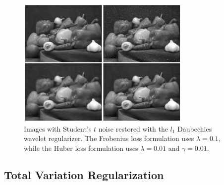 \documentclass[10pt,a4paper]{article}
\begin{document}
	\begin{figure}[H]
		\begin{center}
			\includegraphics[width = 0.75\textwidth]{../figures/waveletStudentD.pdf} 
		\end{center}
		\caption{Images with Student's $t$ noise restored with the $l_1$ Daubechies wavelet regularizer. The Frobenius loss formulation uses $\lambda = 0.1$, while the Huber loss formulation uses $\lambda = 0.01$ and $\gamma = 0.01$.}
		\label{waveletD_student}
	\end{figure}
	
	\subsection{Total Variation Regularization}
	
	
\end{document}

